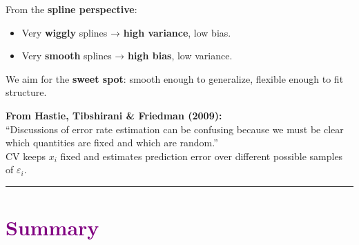 \documentclass[
  letterpaper,
  DIV=11,
  numbers=noendperiod]{scrreprt}
\providecommand{\tightlist}{%
  \setlength{\itemsep}{0pt}\setlength{\parskip}{0pt}}\usepackage{longtable,booktabs,array}
\begin{document}
From the \textbf{spline perspective}:

\begin{itemize}
\tightlist
\item
  Very \textbf{wiggly} splines → \textbf{high variance}, low bias.\\
\item
  Very \textbf{smooth} splines → \textbf{high bias}, low variance.
\end{itemize}

We aim for the \textbf{sweet spot}: smooth enough to generalize,
flexible enough to fit structure.

\textbf{From Hastie, Tibshirani \& Friedman (2009):}\\
``Discussions of error rate estimation can be confusing because we must
be clear which quantities are fixed and which are random.''\\
CV keeps \(x_i\) fixed and estimates prediction error over different
possible samples of \(\varepsilon_i\).

\begin{center}\rule{0.5\linewidth}{0.5pt}\end{center}

\hypertarget{section-28}{%
\section*{\texorpdfstring{\textcolor{purple}{Summary}}{}}\label{section-28}}

\markright{\textcolor{purple}{Summary}}
\end{document}
